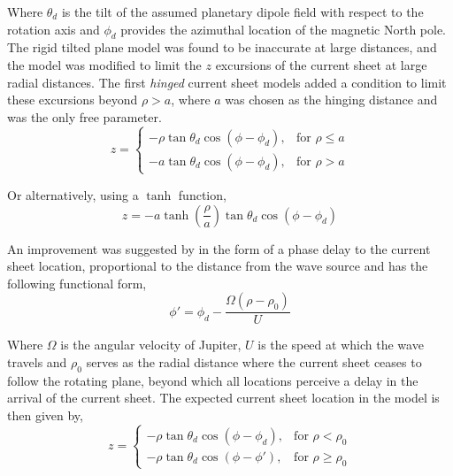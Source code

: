 Where $\theta_d$ is the tilt of the assumed planetary dipole field with respect to the rotation axis and $\phi_d$ provides the azimuthal location of the magnetic North pole. The rigid tilted plane model was found to be inaccurate at large distances, and the model was modified to limit the $z$ excursions of the current sheet at large radial distances. The first \emph{hinged} current sheet models \cite{Smith1974The10,Hill1974ConfigurationMagnetosphere} added a condition to limit these excursions beyond $\rho > a$, where $a$ was chosen as the hinging distance and was the only free parameter.
\begin{equation}
    z = \begin{cases}
    -\rho \tan\theta_d \cos\left(\phi - \phi_d\right), & \text{for } \rho \leq a\\
    -a \tan\theta_d \cos\left(\phi - \phi_d\right), & \text{for } \rho > a
    \end{cases}
\end{equation}

Or alternatively, using a $\tanh$ function, 
\begin{equation}
    z = -a \tanh\left(\frac{\rho}{a}\right) \tan\theta_d \cos\left(\phi - \phi_d\right)
\end{equation}

An improvement was suggested by  in the form of a phase delay to the current sheet location, proportional to the distance from the wave source and has the following functional form,
\begin{equation}
    \phi' = \phi_d - \frac{\Omega \left( \rho - \rho_0\right)}{U}
\end{equation}

Where $\Omega$ is the angular velocity of Jupiter, $U$ is the speed at which the wave travels and $\rho_0$ serves as the radial distance where the current sheet ceases to follow the rotating plane, beyond which all locations perceive a delay in the arrival of the current sheet. The expected current sheet location in the  model is then given by,
\begin{equation}
    z = \begin{cases}
    -\rho \tan\theta_d \cos\left(\phi - \phi_d\right), & \text{for } \rho < \rho_0\\
    -\rho \tan\theta_d \cos\left(\phi - \phi'\right),  & \text{for } \rho \geq \rho_0
    \end{cases}
    \label{eqn:kivelson1978}
\end{equation}

